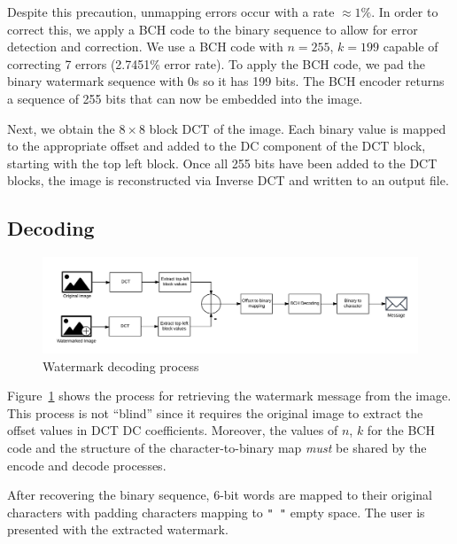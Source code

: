 Despite this precaution, unmapping errors occur with a rate $\approx 1\%$.
In order to correct this, we apply a BCH code to the binary sequence to allow for error detection and correction.
We use a BCH code with $n = 255$, $k = 199$ capable of correcting 7 errors (2.7451\% error rate).
To apply the BCH code, we pad the binary watermark sequence with 0s so it has 199 bits.
The BCH encoder returns a sequence of 255 bits that can now be embedded into the image.

Next, we obtain the $8\times8$ block DCT of the image.
Each binary value is mapped to the appropriate offset and added to the DC component of the DCT block, starting with the top left block.
Once all 255 bits have been added to the DCT blocks, the image is reconstructed via Inverse DCT and written to an output file.

\subsection{Decoding}
\begin{figure}[tbph]
  \centering
  \includegraphics[width=0.95\linewidth]{graphics/decode}
  \caption{Watermark decoding process}
  \label{fig:decode}
\end{figure}

Figure~\ref{fig:decode} shows the process for retrieving the watermark message from the image.
This process is not ``blind'' since it requires the original image to extract the offset values in DCT DC coefficients.
Moreover, the values of $n$, $k$ for the BCH code and the structure of the character-to-binary map \textit{must} be shared by the encode and decode processes.

After recovering the binary sequence, 6-bit words are mapped to their original characters with padding characters mapping to \texttt{" "} empty space.
The user is presented with the extracted watermark.

